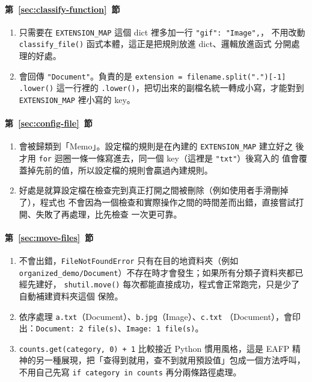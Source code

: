 \paragraph{第~\ref{sec:classify-function}~節}
\begin{enumerate}
\item 只需要在 \texttt{EXTENSION\_MAP} 這個 dict 裡多加一行 \texttt{"gif": "Image",}，
不用改動 \texttt{classify\_file()} 函式本體，這正是把規則放進 dict、邏輯放進函式
分開處理的好處。
\item 會回傳 \texttt{"Document"}。負責的是 \texttt{extension = filename.split(".")[-1]
.lower()} 這一行裡的 \texttt{.lower()}，把切出來的副檔名統一轉成小寫，才能對到
\texttt{EXTENSION\_MAP} 裡小寫的 key。
\end{enumerate}

\paragraph{第~\ref{sec:config-file}~節}
\begin{enumerate}
\item 會被歸類到「Memo」。設定檔的規則是在內建的 \texttt{EXTENSION\_MAP} 建立好之
後才用 \texttt{for} 迴圈一條一條寫進去，同一個 key（這裡是 \texttt{"txt"}）後寫入的
值會覆蓋掉先前的值，所以設定檔的規則會贏過內建規則。
\item 好處是就算設定檔在檢查完到真正打開之間被刪除（例如使用者手滑刪掉了），程式也
不會因為一個檢查和實際操作之間的時間差而出錯，直接嘗試打開、失敗了再處理，比先檢查
一次更可靠。
\end{enumerate}

\paragraph{第~\ref{sec:move-files}~節}
\begin{enumerate}
\item 不會出錯，\texttt{FileNotFoundError} 只有在目的地資料夾（例如
\texttt{organized\_demo/Document}）不存在時才會發生；如果所有分類子資料夾都已經先建好，
\texttt{shutil.move()} 每次都能直接成功，程式會正常跑完，只是少了自動補建資料夾這個
保險。
\item 依序處理 \texttt{a.txt}（Document）、\texttt{b.jpg}（Image）、\texttt{c.txt}
（Document），會印出：\texttt{Document: 2 file(s)}、\texttt{Image: 1 file(s)}。
\item \texttt{counts.get(category, 0) + 1} 比較接近 Python 慣用風格，這是 EAFP
精神的另一種展現，把「查得到就用，查不到就用預設值」包成一個方法呼叫，不用自己先寫
\texttt{if category in counts} 再分兩條路徑處理。
\end{enumerate}

